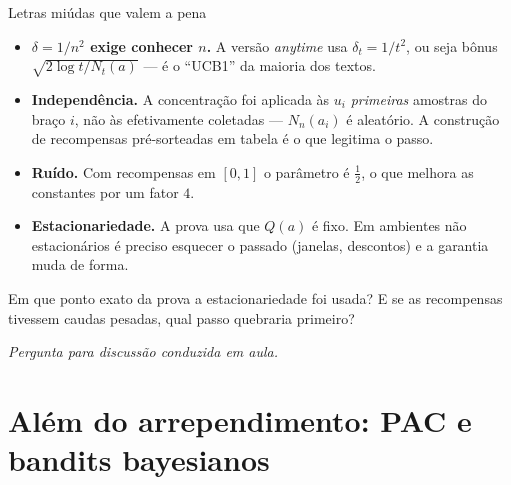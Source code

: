 \documentclass[aspectratio=169, 11pt]{beamer}
\newcommand{\paradiscussao}{\smallskip
  {\footnotesize\color{rlCinza}\itshape Pergunta para discussão conduzida em aula.}}
\begin{document}
\begin{frame}{Letras miúdas que valem a pena}
  {\footnotesize
  \begin{itemize}\setlength{\itemsep}{0.4ex}
    \item \textbf{$\delta = 1/n^{2}$ exige conhecer $n$.} A versão
          \emph{anytime} usa $\delta_t = 1/t^{2}$, ou seja bônus
          $\sqrt{2\log t/N_t(a)}$ --- é o ``UCB1'' da maioria dos textos.
    \item \textbf{Independência.} A concentração foi aplicada às $u_i$
          \emph{primeiras} amostras do braço $i$, não às efetivamente coletadas
          --- $N_n(a_i)$ é aleatório. A construção de recompensas pré-sorteadas
          em tabela é o que legitima o passo.
    \item \textbf{Ruído.} Com recompensas em $[0,1]$ o parâmetro é $\tfrac12$,
          o que melhora as constantes por um fator $4$.
    \item \textbf{Estacionariedade.} A prova usa que $Q(a)$ é fixo. Em
          ambientes não estacionários é preciso esquecer o passado (janelas,
          descontos) e a garantia muda de forma.
  \end{itemize}}

  \begin{quizbox}{}
    Em que ponto exato da prova a estacionariedade foi usada? E se as
    recompensas tivessem caudas pesadas, qual passo quebraria primeiro?
  \end{quizbox}
  \paradiscussao
\end{frame}

\section{Além do arrependimento: PAC e bandits bayesianos}
\end{document}
